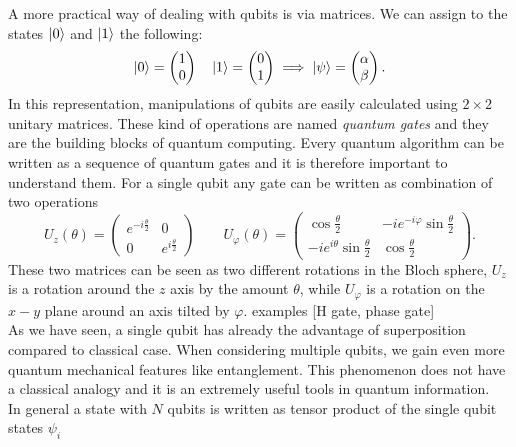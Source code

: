 A more practical way of dealing with qubits is via matrices. We can assign to the states $\ket{0}$ and $\ket{1}$ the following:
\begin{equation}
\ket{0} = \begin{pmatrix}
 1 \\
 0
\end{pmatrix} \quad
\ket{1} = \begin{pmatrix}
 0 \\
 1
\end{pmatrix} \implies \ket{\psi} = \begin{pmatrix}
 \alpha \\
 \beta
\end{pmatrix}.
\end{equation}
In this representation, manipulations of qubits are easily calculated using $2\times2$ unitary matrices. These kind of operations are named \emph{quantum gates} and they are the building blocks of quantum computing. Every quantum algorithm can be written as a sequence of quantum gates and it is therefore important to understand them. For a single qubit any gate can be written as combination of two operations \cite{hempel}
\begin{equation}
\label{quantumgates}
U_z(\theta) =  \begin{pmatrix}
 e^{-i\frac{\theta}{2}} & 0 \\
 0 & e^{i\frac{\theta}{2}}
\end{pmatrix} \qquad U_\varphi(\theta) = \begin{pmatrix}
\cos\frac{\theta}{2} & -i e^{-i\varphi}\sin\frac{\theta}{2} \\
-ie^{i\theta}\sin\frac{\theta}{2} & \cos\frac{\theta}{2}
\end{pmatrix}.
\end{equation}
These two matrices can be seen as two different rotations in the Bloch sphere, $U_z$ is a rotation around the $z$ axis by the amount $\theta$, while $U_\varphi$ is a rotation on the $x-y$ plane around an axis tilted by $\varphi$. examples [H gate, phase gate]\\
\newline
As we have seen, a single qubit has already the advantage of superposition compared to classical case. When considering multiple qubits, we gain even more quantum mechanical features like entanglement. This phenomenon does not have a classical analogy and it is an extremely useful tools in quantum information.\\
In general a state with $N$ qubits is written as tensor product of the single qubit states $\psi_i$
